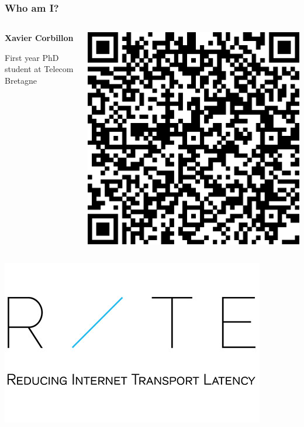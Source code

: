 \begin{frame}[c]
   \frametitle{Who am I?}

   \begin{columns}[T]
     \begin{column}{0.65\linewidth}
         \textbf{Xavier Corbillon}

         First year PhD student at Telecom Bretagne
      \end{column}
      \begin{column}{0.35\linewidth}
         \includegraphics[scale=0.25]{plots/pictures/Xavier/idCard.eps}
      \end{column}
   \end{columns}

   \vspace{-1cm}
   \includegraphics[scale=0.25]{plots/pictures/Xavier/ritelogo.jpg}


\end{frame}
